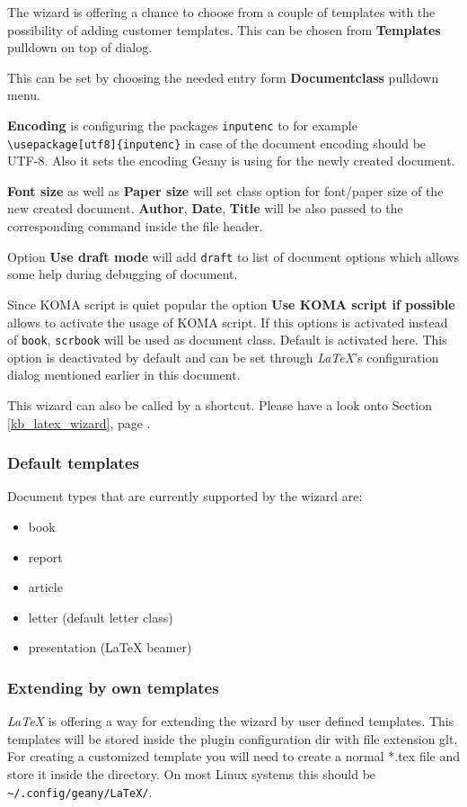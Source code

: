 \documentclass[%
paper=a4,%
fontsize=11pt,%
twoside=false,%
DIV18,%
headsepline,%
plainheadsepline,%
footsepline,%
plainfootsepline,%
bibliography=totoc,%
listof=totoc,%
BCOR10mm,%
parskip=half,%
openany,%
]{scrartcl}
\begin{document}
The wizard is offering a chance to choose from a couple of templates
with the possibility of adding customer templates. This can be
chosen from \textbf{Templates} pulldown on top of dialog.

This can be set by choosing the needed entry form
\textbf{Documentclass} pulldown menu.

\textbf{Encoding} is configuring the packages \texttt{inputenc} to
for example \texttt{\textbackslash usepackage[utf8]\{inputenc\}} in
case of the document encoding should be UTF-8. Also it sets the
encoding Geany is using for the newly created document.

\textbf{Font size} as well as \textbf{Paper size} will set class option
for font/paper size of the new created document. \textbf{Author},
\textbf{Date}, \textbf{Title} will be also passed to the corresponding
command inside the file header.

Option \textbf{Use draft mode} will add \texttt{draft} to list of
document options which allows some help during debugging of document.

Since KOMA script is quiet popular the option \textbf{Use KOMA script
if possible} allows to activate the usage of KOMA script. If this
options is activated instead of \texttt{book}, \texttt{scrbook} will
be used as document class. Default is activated here. This option is
deactivated by default and can be set through \textit{LaTeX}'s
configuration dialog mentioned earlier in this document.

This wizard can also be called by a shortcut. Please have a look onto
Section \ref{kb_latex_wizard}, page \pageref{kb_latex_wizard}.

\subsubsection{Default templates}
Document types that are currently supported by the wizard are:
\begin{itemize}
	\item book
	\item report
	\item article
	\item letter (default letter class)
	\item presentation (\LaTeX{} beamer)
\end{itemize}

\subsubsection{Extending by own templates}
\label{sec:extending_wizard_by_own_templates}
\textit{LaTeX} is offering a way for extending the wizard by user
defined templates. This templates will be stored inside the plugin
configuration dir with file extension glt. For creating a
customized template you will need to create a normal *.tex file and
store it inside the directory. On most Linux systems this should be
\texttt{\textasciitilde/.config/geany/LaTeX/}.
\end{document}
